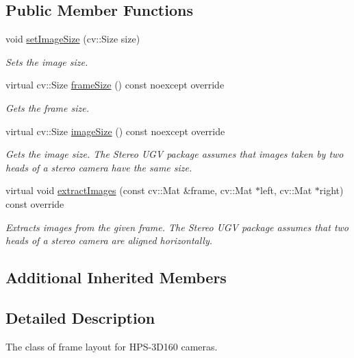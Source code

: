\subsection*{Public Member Functions}
\begin{DoxyCompactItemize}
\item 
void \hyperlink{classstereo__ugv_1_1HPS3D160FrameLayout_af8ec41171a86b9ed3724d9e90b756fbb}{set\+Image\+Size} (cv\+::\+Size size)
\begin{DoxyCompactList}\small\item\em Sets the image size. \end{DoxyCompactList}\item 
virtual cv\+::\+Size \hyperlink{classstereo__ugv_1_1HPS3D160FrameLayout_add697132a4d32b0f1fc49f35f3b8fa0f}{frame\+Size} () const noexcept override
\begin{DoxyCompactList}\small\item\em Gets the frame size. \end{DoxyCompactList}\item 
virtual cv\+::\+Size \hyperlink{classstereo__ugv_1_1HPS3D160FrameLayout_ab7fb47261d8a8132ac0ca7a15b69500e}{image\+Size} () const noexcept override
\begin{DoxyCompactList}\small\item\em Gets the image size. The Stereo U\+GV package assumes that images taken by two heads of a stereo camera have the same size. \end{DoxyCompactList}\item 
virtual void \hyperlink{classstereo__ugv_1_1HPS3D160FrameLayout_a224d3fddea38c0c564baa8d391a396fa}{extract\+Images} (const cv\+::\+Mat \&frame, cv\+::\+Mat $\ast$left, cv\+::\+Mat $\ast$right) const override
\begin{DoxyCompactList}\small\item\em Extracts images from the given frame. The Stereo U\+GV package assumes that two heads of a stereo camera are aligned horizontally. \end{DoxyCompactList}\end{DoxyCompactItemize}
\subsection*{Additional Inherited Members}


\subsection{Detailed Description}
The class of frame layout for H\+P\+S-\/3\+D160 cameras. 

